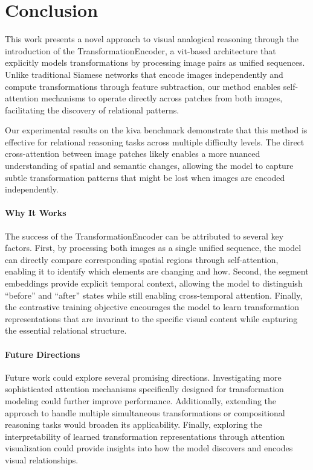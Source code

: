 \documentclass[twocolumn]{article} %
\begin{document}
\section{Conclusion}

This work presents a novel approach to visual analogical reasoning through the introduction of the TransformationEncoder, a \gls{vit}-based architecture that explicitly models transformations by processing image pairs as unified sequences. Unlike traditional Siamese networks that encode images independently and compute transformations through feature subtraction, our method enables self-attention mechanisms to operate directly across patches from both images, facilitating the discovery of relational patterns.

Our experimental results on the \gls{kiva} benchmark demonstrate that this method is effective for relational reasoning tasks across multiple difficulty levels. The direct cross-attention between image patches likely enables a more nuanced understanding of spatial and semantic changes, allowing the model to capture subtle transformation patterns that might be lost when images are encoded independently.

\paragraph{Why It Works}
The success of the TransformationEncoder can be attributed to several key factors. First, by processing both images as a single unified sequence, the model can directly compare corresponding spatial regions through self-attention, enabling it to identify which elements are changing and how. Second, the segment embeddings provide explicit temporal context, allowing the model to distinguish ``before'' and ``after'' states while still enabling cross-temporal attention. Finally, the contrastive training objective encourages the model to learn transformation representations that are invariant to the specific visual content while capturing the essential relational structure.

\paragraph{Future Directions}
Future work could explore several promising directions. Investigating more sophisticated attention mechanisms specifically designed for transformation modeling could further improve performance. Additionally, extending the approach to handle multiple simultaneous transformations or compositional reasoning tasks would broaden its applicability. Finally, exploring the interpretability of learned transformation representations through attention visualization could provide insights into how the model discovers and encodes visual relationships.

\normalsize

\end{document}
